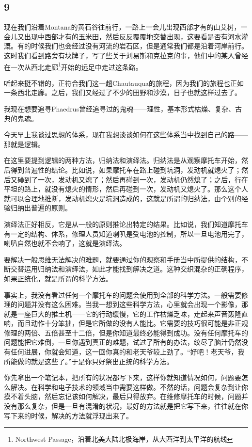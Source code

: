 \documentclass[UTF8]{article}
\begin{document}
\subsection*{9}
\par 现在我们沿着Montana的黄石谷往前行，一路上一会儿出现西部才有的山艾树，一会儿又出现中西部才有的玉米田，然后反反覆覆地交替出现，这要看是否有河水灌溉。有的时候我们也会经过没有河流的岩石区，但是通常我们都是沿着河岸前行。这时我们看到路旁有块牌子，写了些关于刘易斯和克拉克的事，他们中的某人曾经在一次从西北走廊\footnote{Northwest Passage，沿着北美大陆北极海岸，从大西洋到太平洋的航线}开始的远足中走过这条路。
\par 听起来挺不错的，正符合我们这一趟Chautauqua的旅程，因为我们的旅程也正如一条西北走廊。之后，我们又经过了不少的田野和沙漠，日子也就这样过去了。
\par 我现在想要追寻Phaedrus曾经追寻过的鬼魂——理性，基本形式枯燥、复杂、古典的鬼魂。
\par 今天早上我谈过思想的体系，现在我想谈谈如何在这些体系当中找到自己的路——那就是逻辑。
\par 在这里要提到逻辑的两种方法，归纳法和演绎法。归纳法是从观察摩托车开始，然后得到普遍性的结论。比如说，如果摩托车在路上碰到坑洞，发动机就熄火了；然后又碰到了一次，发动机又熄了；然后再碰到一次，发动机仍然熄了；之后，行在平坦的路上，就没有熄火的情形，然后再碰到一次，发动机又熄火了。那么这个人就可以合理地推断，发动机熄火是坑洞造成的，这就是所谓的归纳法，由个别的经验归纳出普遍的原则。
\par 演绎法正好相反，它是从一般的原则推论出特定的结果。比如说，我们知道摩托车有一定的结构、体系，修理人员知道喇叭是受电池的控制，所以一旦电池用完了，喇叭自然也就不会响了，这就是演绎法。
\par 要解决一般思维无法解决的难题，就要通过你的观察和手册当中所提供的结构，不断交替运用归纳法和演绎法，如此才能找到解决之道。这种交织混杂的正确程序，如果正统化，就是所谓的科学方法。
\par 事实上，我没有看过任何一个摩托车的问题会使用到全部的科学方法。一般需要修理的问题并没有这么困难。当我一想到这些科学方法，心里就会出现一个影像，那就是一座巨大的推土机——它的行动缓慢，它的工作枯燥乏味，走起来声音轰隆直响，而且动作十分笨拙，但是它所做的没有人能比。它需要的技巧很可能是非正规修理的两倍、五倍甚至十二倍，但是你知道最终必能得到成功。没有任何摩托车的问题能把它难倒，一旦你遇到真正的难题，试过了所有的办法，绞尽了脑汁仍然没有任何进展，你就会知道，这一回你真的和老天爷较上劲了。“好吧！老天爷，我所能做的就是这些了。”于是你只好祭出正统的科学方法。
\par 你先拿出一个笔记本，把所有的状况都写下来，这样你就知道情况如何，问题要怎么解决。在科学和电子技术的领域当中需要这样做。不然的话，问题会复杂到让你摸不着头脑，然后忘记该如何解决，最后只得放弃。在维修摩托车的时候，问题并没有那么复杂，但是一旦有混淆的状况，最好的方法就是把它写下来，往往就在你写下来的时候，解决的方法就浮现出来了。
\end{document}
